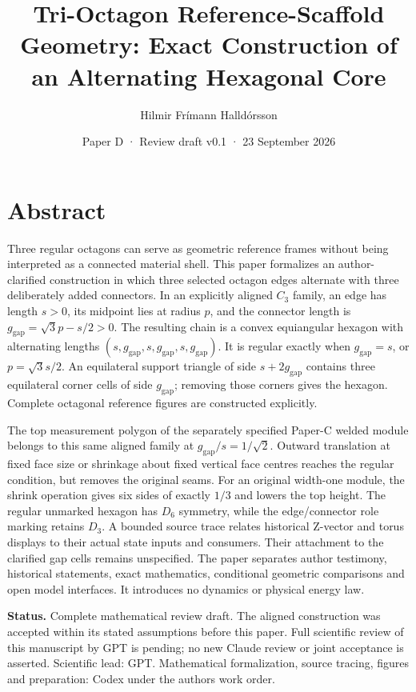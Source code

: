 \documentclass[
  11pt,
  a4paper,
]{article}
\title{Tri-Octagon Reference-Scaffold Geometry: Exact Construction of an Alternating Hexagonal Core}
\author{Hilmir Frímann Halldórsson}
\date{Paper D · Review draft v0.1 · 23 September 2026}
\begin{document}
\maketitle

\section{Abstract}\label{abstract}

Three regular octagons can serve as geometric reference frames without being interpreted as a connected material shell. This paper formalizes an author-clarified construction in which three selected octagon edges alternate with three deliberately added connectors. In an explicitly aligned \(C_3\) family, an edge has length \(s>0\), its midpoint lies at radius \(p\), and the connector length is \(g_{\mathrm{gap}}=\sqrt3p-s/2>0\). The resulting chain is a convex equiangular hexagon with alternating lengths \((s,g_{\mathrm{gap}},s,g_{\mathrm{gap}},s,g_{\mathrm{gap}})\). It is regular exactly when \(g_{\mathrm{gap}}=s\), or \(p=\sqrt3s/2\). An equilateral support triangle of side \(s+2g_{\mathrm{gap}}\) contains three equilateral corner cells of side \(g_{\mathrm{gap}}\); removing those corners gives the hexagon. Complete octagonal reference figures are constructed explicitly.

The top measurement polygon of the separately specified Paper-C welded module belongs to this same aligned family at \(g_{\mathrm{gap}}/s=1/\sqrt2\). Outward translation at fixed face size or shrinkage about fixed vertical face centres reaches the regular condition, but removes the original seams. For an original width-one module, the shrink operation gives six sides of exactly \(1/3\) and lowers the top height. The regular unmarked hexagon has \(D_6\) symmetry, while the edge/connector role marking retains \(D_3\). A bounded source trace relates historical Z-vector and torus displays to their actual state inputs and consumers. Their attachment to the clarified gap cells remains unspecified. The paper separates author testimony, historical statements, exact mathematics, conditional geometric comparisons and open model interfaces. It introduces no dynamics or physical energy law.

\textbf{Status.} Complete mathematical review draft. The aligned construction was accepted within its stated assumptions before this paper. Full scientific review of this manuscript by GPT is pending; no new Claude review or joint acceptance is asserted. Scientific lead: GPT. Mathematical formalization, source tracing, figures and preparation: Codex under the author\textquotesingle s work order.
\end{document}
